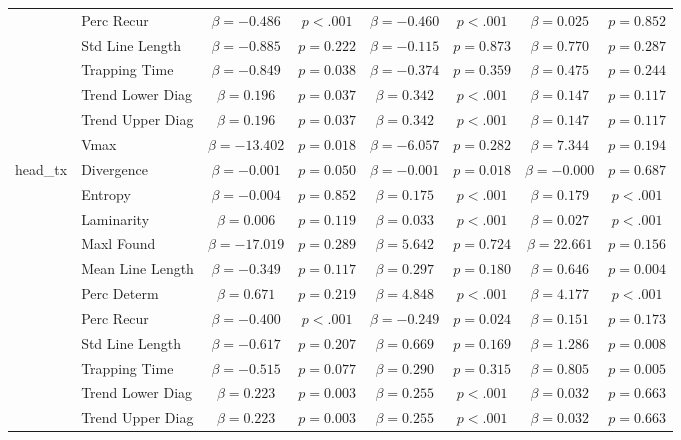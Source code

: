 \begin{tabular}{llcc|cc|cc}
 & Perc Recur & $\beta = -0.486$ & $p < .001$ & $\beta = -0.460$ & $p < .001$ & $\beta = 0.025$ & $p = 0.852$ \\
 & Std Line Length & $\beta = -0.885$ & $p = 0.222$ & $\beta = -0.115$ & $p = 0.873$ & $\beta = 0.770$ & $p = 0.287$ \\
 & Trapping Time & $\beta = -0.849$ & $p = 0.038$ & $\beta = -0.374$ & $p = 0.359$ & $\beta = 0.475$ & $p = 0.244$ \\
 & Trend Lower Diag & $\beta = 0.196$ & $p = 0.037$ & $\beta = 0.342$ & $p < .001$ & $\beta = 0.147$ & $p = 0.117$ \\
 & Trend Upper Diag & $\beta = 0.196$ & $p = 0.037$ & $\beta = 0.342$ & $p < .001$ & $\beta = 0.147$ & $p = 0.117$ \\
 & Vmax & $\beta = -13.402$ & $p = 0.018$ & $\beta = -6.057$ & $p = 0.282$ & $\beta = 7.344$ & $p = 0.194$ \\
\midrule
\multirow{12}{*}{head_tx} & Divergence & $\beta = -0.001$ & $p = 0.050$ & $\beta = -0.001$ & $p = 0.018$ & $\beta = -0.000$ & $p = 0.687$ \\
 & Entropy & $\beta = -0.004$ & $p = 0.852$ & $\beta = 0.175$ & $p < .001$ & $\beta = 0.179$ & $p < .001$ \\
 & Laminarity & $\beta = 0.006$ & $p = 0.119$ & $\beta = 0.033$ & $p < .001$ & $\beta = 0.027$ & $p < .001$ \\
 & Maxl Found & $\beta = -17.019$ & $p = 0.289$ & $\beta = 5.642$ & $p = 0.724$ & $\beta = 22.661$ & $p = 0.156$ \\
 & Mean Line Length & $\beta = -0.349$ & $p = 0.117$ & $\beta = 0.297$ & $p = 0.180$ & $\beta = 0.646$ & $p = 0.004$ \\
 & Perc Determ & $\beta = 0.671$ & $p = 0.219$ & $\beta = 4.848$ & $p < .001$ & $\beta = 4.177$ & $p < .001$ \\
 & Perc Recur & $\beta = -0.400$ & $p < .001$ & $\beta = -0.249$ & $p = 0.024$ & $\beta = 0.151$ & $p = 0.173$ \\
 & Std Line Length & $\beta = -0.617$ & $p = 0.207$ & $\beta = 0.669$ & $p = 0.169$ & $\beta = 1.286$ & $p = 0.008$ \\
 & Trapping Time & $\beta = -0.515$ & $p = 0.077$ & $\beta = 0.290$ & $p = 0.315$ & $\beta = 0.805$ & $p = 0.005$ \\
 & Trend Lower Diag & $\beta = 0.223$ & $p = 0.003$ & $\beta = 0.255$ & $p < .001$ & $\beta = 0.032$ & $p = 0.663$ \\
 & Trend Upper Diag & $\beta = 0.223$ & $p = 0.003$ & $\beta = 0.255$ & $p < .001$ & $\beta = 0.032$ & $p = 0.663$ \\

\end{tabular}
